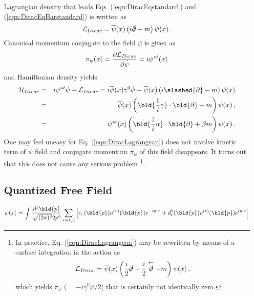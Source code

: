 Lagrangian density that leads Eqs. (\ref{eqn:DiracEqstandard}) and (\ref{eqn:DiracEqBarstandard})
is written as
\begin{eqnarray}
{\cal L}_{Dirac}
=
\overline{\psi}(x)
\left(i \slashed{\partial} - m \right)
\psi(x) \,.
\label{eqn:DiracLagrangean}
\end{eqnarray}
Canonical momentum conjugate to the field $\psi$ is given as
\begin{eqnarray}
\pi_{\psi}(x) = \frac{\partial {\cal L}_{Dirac}}{\partial \dot{\psi}}
=
i \psi^{*t} (x) 
\end{eqnarray}
and Hamiltonian density yields
\begin{eqnarray}
{\cal H}_{Dirac}
&=&
i \psi^{*t}  \dot {\psi} - {\cal L}_{Dirac}
= 
i \overline{\psi}(x) \gamma^0 \dot {\psi}
- 
\overline{\psi}(x)
\left(i \slashed{\partial} - m \right)
\psi(x)
\nonumber\\
&=&
\overline{\psi}(x)
\left(
 \bld{ \frac{1}{i}\gamma}\cdot\bld{\partial} + m 
 \right)
 \psi(x)\,,
 \\
 &=&
\psi^{*t}(x)
\left(
 \bld{ \frac{1}{i}\alpha}\cdot\bld{\partial} + \beta m 
 \right)
 \psi(x)\,.
\end{eqnarray}
One may feel uneasy for Eq. (\ref{eqn:DiracLagrangean})
does not involve kinetic term of $\overline{\psi}$ field and
conjugate momentum $\pi_{\overline{\psi}}$ of this field disappears. It turns out
that this does not cause any serious problem
\footnote{%
In practice,
Eq. (\ref{eqn:DiracLagrangean}) may be rewritten by means
of a surface integration in the action as \cite{ref:Itzykson-Zuber}
\begin{eqnarray*}
{\cal L}_{Dirac}
=
\overline{\psi}(x)
\left(
\frac{i}{2} \slashed{\partial}
- \frac{i}{2}  \stackrel{\leftarrow}{\slashed{\partial}}
 - m \right)
\psi(x) \,,
\label{eqn:DiracLagrangeanIZ}
\end{eqnarray*}
which yields $\pi_{\overline{\psi}}$ ($= -i \gamma^0 \psi / 2$)
that is certainly not identically zero.
}%
.

\subsection{Quantized Free Field}
\begin{equation}
\psi(x) 
=
\int \frac{d^3 \bld{p}}{\sqrt{(2\pi)^3} 2 p^0}
\sum_{r = 1,2}
\left[
c_r(\bld{p}) u^{(r)}(\bld{p}) e^{-ip \cdot x}
+
d_r^\dagger(\bld{p}) v^{(r)}(\bld{p}) e^{ip \cdot x}
\right]
\end{equation}

